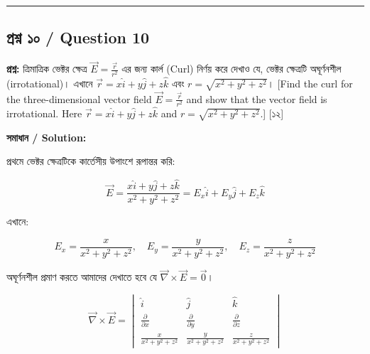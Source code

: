 \documentclass[11pt, a4paper]{article}
\begin{document}
\vspace{1em}
\begin{center}
\end{center}

\vspace{1em}
\noindent\rule{\textwidth}{0.4pt}
\vspace{1em}

\subsection*{প্রশ্ন ১০ / Question 10}
\textbf{প্রশ্ন:} ত্রিমাত্রিক ভেক্টর ক্ষেত্র $\vec{E} = \frac{\vec{r}}{r^2}$ এর জন্য কার্ল (Curl) নির্ণয় করে দেখাও যে, ভেক্টর ক্ষেত্রটি অঘূর্ণনশীল (irrotational)। এখানে $\vec{r} = x\hat{i} + y\hat{j} + z\hat{k}$ এবং $r = \sqrt{x^2+y^2+z^2}$। [Find the curl for the three-dimensional vector field $\vec{E} = \frac{\vec{r}}{r^2}$ and show that the vector field is irrotational. Here $\vec{r} = x\hat{i} + y\hat{j} + z\hat{k}$ and $r = \sqrt{x^2+y^2+z^2}$.] [১২]

\vspace{0.8em}
\textbf{সমাধান / Solution:}

প্রথমে ভেক্টর ক্ষেত্রটিকে কার্তেসীয় উপাংশে রূপান্তর করি:

$$\vec{E} = \frac{x\hat{i} + y\hat{j} + z\hat{k}}{x^2 + y^2 + z^2} = E_x\hat{i} + E_y\hat{j} + E_z\hat{k}$$

এখানে:

$$E_x = \frac{x}{x^2+y^2+z^2}, \quad E_y = \frac{y}{x^2+y^2+z^2}, \quad E_z = \frac{z}{x^2+y^2+z^2}$$

অঘূর্ণনশীল প্রমাণ করতে আমাদের দেখাতে হবে যে $\vec{\nabla} \times \vec{E} = \vec{0}$।

$$\vec{\nabla} \times \vec{E} = \begin{vmatrix} \hat{i} & \hat{j} & \hat{k} \\ \frac{\partial}{\partial x} & \frac{\partial}{\partial y} & \frac{\partial}{\partial z} \\ \frac{x}{x^2+y^2+z^2} & \frac{y}{x^2+y^2+z^2} & \frac{z}{x^2+y^2+z^2} \end{vmatrix}$$
\end{document}
